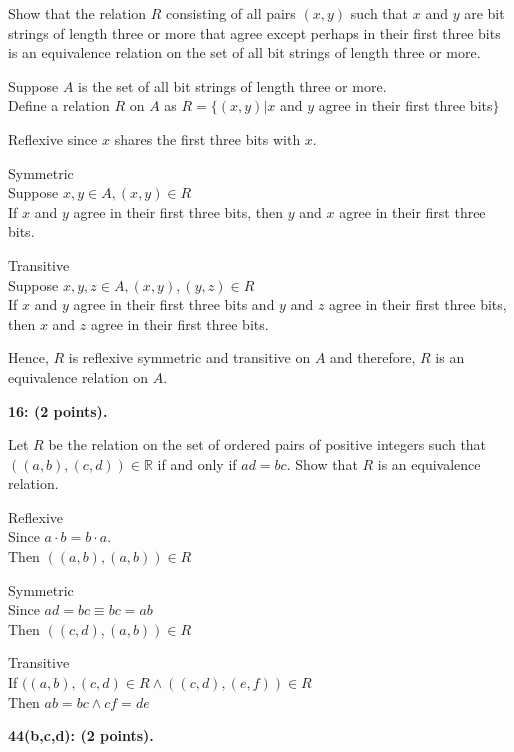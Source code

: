 \documentclass[12pt]{article}  %
\begin{document}
\noindent
Show that the relation $R$ consisting of all pairs $(x,y)$ such that $x$ and $y$ are bit strings of length three or more that agree except perhaps in their first three bits is an equivalence relation on the set of all bit strings of length three or more.

\noindent
Suppose $A$ is the set of all bit strings of length three or more.\\
Define a relation $R$ on $A$ as $R=\{(x,y)\vert x$ and $y$ agree in their first three bits$\}$

\noindent
Reflexive since $x$ shares the first three bits with $x$. 

\noindent
Symmetric\\
Suppose $x,y\in A,(x,y)\in R$\\
If $x$ and $y$ agree in their first three bits, then $y$ and $x$ agree in their first three bits.

\noindent
Transitive\\
Suppose $x,y,z\in A,(x,y),(y,z)\in R$\\
If $x$ and $y$ agree in their first three bits and $y$ and $z$ agree in their first three bits, then $x$ and $z$ agree in their first three bits.

\noindent
Hence, $R$ is reflexive symmetric and transitive on $A$ and therefore, $R$ is an equivalence relation on $A$. 

\clearpage
\noindent
{\bf 16: (2 points).}

\noindent
Let $R$ be the relation on the set of ordered pairs of positive integers such that $((a,b),(c,d))\in\mathbb{R}$ if and only if $ad=bc$. Show that $R$ is an equivalence relation.

\noindent
Reflexive\\
Since $a\cdot b=b\cdot a$.\\
Then $((a,b),(a,b))\in R$

\noindent
Symmetric\\
Since $ad=bc\equiv bc=ab$\\
Then $((c,d),(a,b))\in R$

\noindent
Transitive\\
If $((a,b),(c,d)\in R\land((c,d),(e,f))\in R$\\
Then $ab=bc\land cf=de$

\noindent
{\bf 44(b,c,d): (2 points).}
\end{document}
